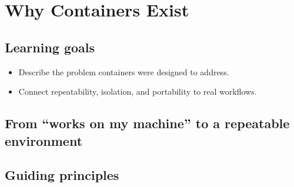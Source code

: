 \chapter{Why Containers Exist}
\label{chap:why-containers-exist}

\section{Learning goals}
\begin{itemize}
  \item Describe the problem containers were designed to address.
  \item Connect repeatability, isolation, and portability to real workflows.
\end{itemize}

\section{From ``works on my machine'' to a repeatable environment}

\section{Guiding principles}
